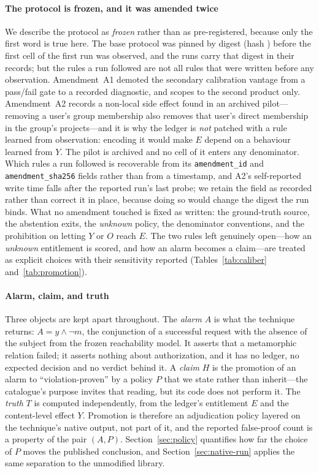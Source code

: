 \paragraph{The protocol is frozen, and it was amended twice}
\label{sec:frozen}
We describe the protocol as \emph{frozen} rather than as pre-registered, because
only the first word is true here. The base protocol was pinned by digest (hash
\texttt{\TmpProtocol}) before the first cell of the first run was observed, and
the runs carry that digest in their records; but the rules a run followed are not
all rules that were written before any observation. Amendment~A1 demoted the
secondary calibration vantage from a pass/fail gate to a recorded diagnostic, and
scopes to the second product only. Amendment~A2 records a non-local side effect
found in an archived pilot---removing a user's group membership also removes that
user's direct membership in the group's projects---and it is why the ledger is
\emph{not} patched with a rule learned from observation: encoding it would make
$E$ depend on a behaviour learned from $Y$. The pilot is archived and no cell of
it enters any denominator. Which rules a run followed is recoverable from its
\texttt{amendment\_id} and \texttt{amendment\_sha256} fields rather than from a
timestamp, and A2's self-reported write time falls after the reported run's last
probe; we retain the field as recorded rather than correct it in place, because
doing so would change the digest the run binds. What no amendment touched is
fixed as written: the ground-truth source, the abstention exits, the
\emph{unknown} policy, the denominator conventions, and the prohibition on
letting $Y$ or $O$ reach $E$. The two rules left genuinely open---how an
\emph{unknown} entitlement is scored, and how an alarm becomes a claim---are
treated as explicit choices with their sensitivity reported
(Tables~\ref{tab:caliber} and~\ref{tab:promotion}).

\paragraph{Alarm, claim, and truth}
\label{sec:stages}
Three objects are kept apart throughout. The \emph{alarm} $A$ is what the
technique returns: $A=y\wedge\neg m$, the conjunction of a successful request with
the absence of the subject from the frozen reachability model. It asserts that a
metamorphic relation failed; it asserts nothing about authorization, and it has no
ledger, no expected decision and no verdict behind it. A \emph{claim} $H$ is the
promotion of an alarm to ``violation-proven'' by a policy $P$ that we state rather
than inherit---the catalogue's purpose invites that reading, but its code does not
perform it. The \emph{truth} $T$ is computed independently, from the ledger's
entitlement $E$ and the content-level effect $Y$. Promotion is therefore an
adjudication policy layered on the technique's native output, not part of it, and
the reported false-proof count is a property of the pair $(A,P)$.
Section~\ref{sec:policy} quantifies how far the choice of $P$ moves the published
conclusion, and Section~\ref{sec:native-run} applies the same separation to the
unmodified library.

